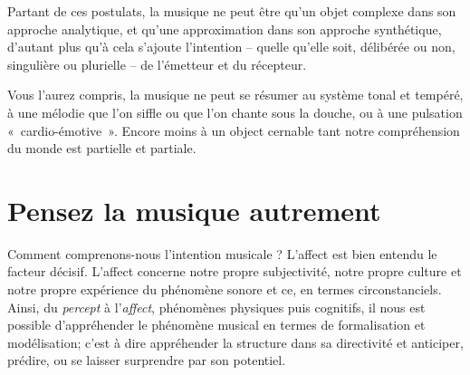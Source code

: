 \bigskip

Partant de ces postulats, la musique ne peut être qu'un objet complexe dans son approche analytique, et qu'une approximation dans son approche synthétique, d'autant plus qu'à cela s'ajoute l'intention -- quelle qu'elle soit, délibérée ou non, singulière ou plurielle -- de l'émetteur et du récepteur. 

Vous l'aurez compris, la musique ne peut se résumer au système tonal et tempéré, à une mélodie que l'on siffle ou que l'on chante sous la douche, ou à une pulsation \hbox{« cardio-}\hbox{émotive »}. Encore moins à un object cernable tant notre compréhension du monde est partielle et partiale. 

\section*{Pensez la musique autrement}
\label{think}

Comment comprenons-nous l’intention musicale ? L’affect est bien entendu le facteur décisif. L’affect concerne notre propre subjectivité, notre propre culture et notre propre expérience du phénomène sonore et ce, en termes circonstanciels. Ainsi, du \textit{percept} à l'\textit{affect}, phénomènes physiques puis cognitifs, il nous est possible d’appréhender le phénomène musical en termes de formalisation et modélisation; c'est à dire appréhender la structure dans sa directivité et anticiper, prédire, ou se laisser surprendre par son potentiel.  

